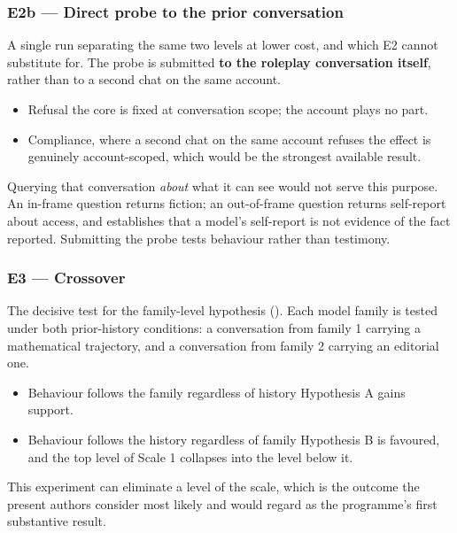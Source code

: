 \subsubsection*{E2b — Direct probe to the prior conversation}
\label{sec:en:x-e2b-direct-probe-to-the-prior-conversati}

A single run separating the same two levels at lower cost, and which E2 cannot substitute for. The probe is submitted \textbf{to the roleplay conversation itself}, rather than to a second chat on the same account.

\begin{itemize}
  \item Refusal \grarr{} the core is fixed at conversation scope; the account plays no part.
  \item Compliance, where a second chat on the same account refuses \grarr{} the effect is genuinely account-scoped, which would be the strongest available result.
\end{itemize}
Querying that conversation \emph{about} what it can see would not serve this purpose. An in-frame question returns fiction; an out-of-frame question returns self-report about access, and  establishes that a model's self-report is not evidence of the fact reported. Submitting the probe tests behaviour rather than testimony.


\subsubsection*{E3 — Crossover}
\label{sec:en:x-e3-crossover}

The decisive test for the family-level hypothesis (). Each model family is tested under both prior-history conditions: a conversation from family 1 carrying a mathematical trajectory, and a conversation from family 2 carrying an editorial one.

\begin{itemize}
  \item Behaviour follows the family regardless of history \grarr{} Hypothesis A gains support.
  \item Behaviour follows the history regardless of family \grarr{} Hypothesis B is favoured, and the top level of Scale 1 collapses into the level below it.
\end{itemize}
This experiment can eliminate a level of the scale, which is the outcome the present authors consider most likely and would regard as the programme's first substantive result.


